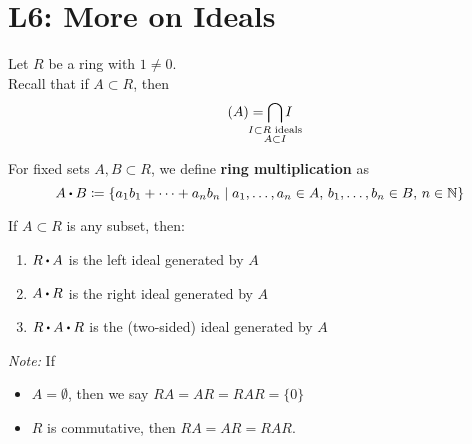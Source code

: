 \documentclass[../Main.tex]{subfiles}
\begin{document}
\chapter{L6: More on Ideals}
Let $R$ be a ring with $1\ne 0$.\\
Recall that if $A\subset R$, then
	\[(A)= \bigcap_{\mathclap{\substack{I \subset R \text{ ideals}\\A\subset I} } } I\]
\begin{dfn}[title= Ring Multiplication]
	For fixed sets $A,B \subset R$, we define \textbf{ring multiplication} as
	\[A\rdot B \coloneqq \{a_1b_1 + \dots + a_nb_n \mid a_1,\dots, a_n \in A,\, b_1, \dots, b_n \in B,\, n\in \N\}\]
\end{dfn}
\begin{prop}[title = Characterization of ideal generated by a set]
	If $A\subset R$ is any subset, then:
	\begin{enumerate}
		\item $R\rdot A$ is the left ideal generated by $A$
		\item $A\rdot R $ is the right ideal generated by $A$
		\item $R\rdot A\rdot R$ is the (two-sided) ideal generated by $A$
	\end{enumerate}
\textit{Note:} If
\begin{itemize}
	\item $A=\emptyset$, then we say $RA=AR=RAR=\{0\}$
	\item $R$ is commutative, then $RA=AR=RAR$.
\end{itemize}
\end{prop}
\end{document}

